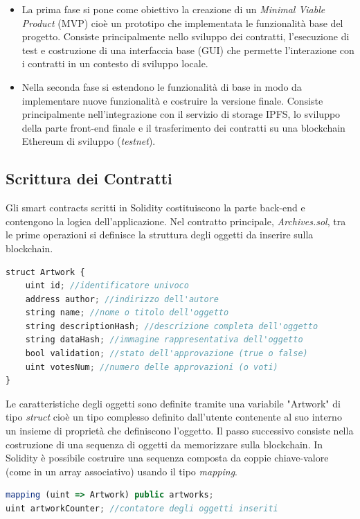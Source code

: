 \begin{itemize}

\item La prima fase si pone come obiettivo la creazione di un \emph{Minimal Viable Product} (MVP) cioè un prototipo che  implementata le funzionalità base del progetto. Consiste principalmente nello sviluppo dei contratti, l'esecuzione di test e costruzione di una interfaccia base (GUI) che permette l'interazione con i contratti in un contesto di sviluppo locale.

\item Nella seconda fase si estendono le funzionalità di base in modo da implementare nuove funzionalità e costruire la versione finale. Consiste principalmente nell'integrazione con il servizio di storage IPFS, lo sviluppo della parte front-end finale e il trasferimento dei contratti su una blockchain Ethereum di sviluppo (\emph{testnet}).

\end{itemize}

\subsection{Scrittura dei Contratti}

Gli smart contracts scritti in Solidity costituiscono la parte back-end e contengono la logica dell'applicazione. Nel contratto principale, \emph{Archives.sol}, tra le prime operazioni si definisce la struttura degli oggetti da inserire sulla blockchain.
\\
\begin{lstlisting}[caption={Struttura degli oggetti},language=JavaScript]
struct Artwork {
    uint id; //identificatore univoco
    address author; //indirizzo dell'autore
    string name; //nome o titolo dell'oggetto
    string descriptionHash; //descrizione completa dell'oggetto
    string dataHash; //immagine rappresentativa dell'oggetto
    bool validation; //stato dell'approvazione (true o false)
    uint votesNum; //numero delle approvazioni (o voti)
}
\end{lstlisting}

Le caratteristiche degli oggetti sono definite tramite una variabile "Artwork" di tipo \emph{struct} cioè un tipo complesso definito dall'utente contenente al suo interno un insieme di proprietà che definiscono l'oggetto. Il passo successivo consiste nella costruzione di una sequenza di oggetti da memorizzare sulla blockchain. In Solidity è possibile costruire una sequenza composta da coppie chiave-valore (come in un array associativo) usando il tipo \emph{mapping}.
\\
\begin{lstlisting}[caption={Associazione chiave-valore},language=JavaScript]
mapping (uint => Artwork) public artworks;
uint artworkCounter; //contatore degli oggetti inseriti 
\end{lstlisting}

